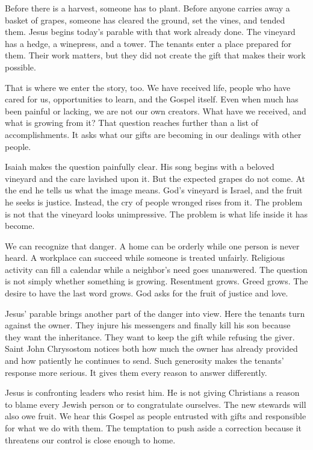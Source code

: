 Before there is a harvest, someone has to plant. Before anyone carries away a basket of grapes, someone has cleared the ground, set the vines, and tended them. Jesus begins today's parable with that work already done. The vineyard has a hedge, a winepress, and a tower. The tenants enter a place prepared for them. Their work matters, but they did not create the gift that makes their work possible.

That is where we enter the story, too. We have received life, people who have cared for us, opportunities to learn, and the Gospel itself. Even when much has been painful or lacking, we are not our own creators. What have we received, and what is growing from it? That question reaches further than a list of accomplishments. It asks what our gifts are becoming in our dealings with other people.

Isaiah makes the question painfully clear. His song begins with a beloved vineyard and the care lavished upon it. But the expected grapes do not come. At the end he tells us what the image means. God's vineyard is Israel, and the fruit he seeks is justice. Instead, the cry of people wronged rises from it. The problem is not that the vineyard looks unimpressive. The problem is what life inside it has become.

We can recognize that danger. A home can be orderly while one person is never heard. A workplace can succeed while someone is treated unfairly. Religious activity can fill a calendar while a neighbor's need goes unanswered. The question is not simply whether something is growing. Resentment grows. Greed grows. The desire to have the last word grows. God asks for the fruit of justice and love.

Jesus' parable brings another part of the danger into view. Here the tenants turn against the owner. They injure his messengers and finally kill his son because they want the inheritance. They want to keep the gift while refusing the giver. Saint John Chrysostom notices both how much the owner has already provided and how patiently he continues to send. Such generosity makes the tenants' response more serious. It gives them every reason to answer differently.

Jesus is confronting leaders who resist him. He is not giving Christians a reason to blame every Jewish person or to congratulate ourselves. The new stewards will also owe fruit. We hear this Gospel as people entrusted with gifts and responsible for what we do with them. The temptation to push aside a correction because it threatens our control is close enough to home.

